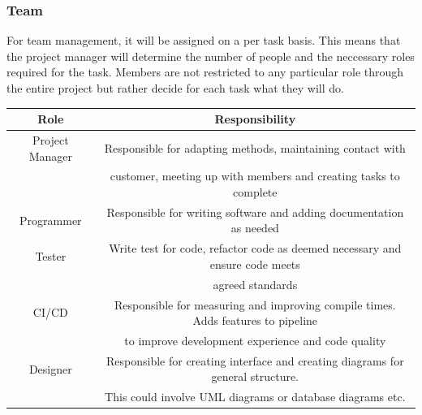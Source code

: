 \subsubsection{Team}
For team management, it will be assigned on a per task basis.
This means that the project manager will determine the number of people
and the neccessary roles required for the task.
Members are not restricted to any particular role through the entire project but rather
decide for each task what they will do.
\begin{center}
    \begin{tabular}{|c|c|}
         \hline
         Role & Responsibility \\
         \hline
         Project Manager & Responsible for adapting methods, maintaining contact with\\
         & customer, meeting up with members and creating tasks to complete \\
         \hline
         Programmer & Responsible for writing software and adding documentation as needed\\
         \hline
         Tester & Write test for code, refactor code as deemed necessary and ensure code meets\\
         & agreed standards\\
         \hline
         CI/CD & Responsible for measuring and improving compile times. Adds features to pipeline\\
         & to improve development experience and code quality\\
         \hline
         Designer & Responsible for creating interface and creating diagrams for general structure.\\
         & This could involve UML diagrams or database diagrams etc.\\
         \hline
         
    \end{tabular}
\end{center}

